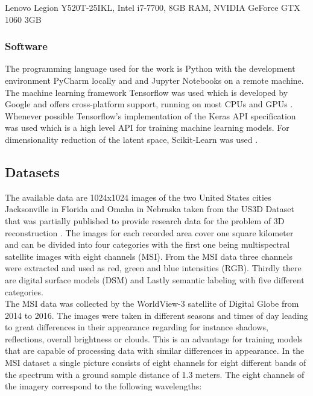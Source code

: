Lenovo Legion Y520T-25IKL, Intel i7-7700, 8GB RAM, NVIDIA GeForce GTX 1060 3GB

\subsubsection{Software}

The programming language used for the work is Python \parencite{1995-rossum-python} with the development
environment PyCharm locally
and and Jupyter Notebooks on a remote machine. The machine learning framework Tensorflow was used which
is developed by Google and offers cross-platform support, running on most CPUs and GPUs 
\parencite{2015-martin-tensorflow}.
Whenever possible Tensorflow's implementation of the Keras API specification was used which is a high level API
for training machine learning models. For dimensionality reduction of the latent space, Scikit-Learn was used
\parencite{2011-pedregosa-scikit}.

\subsection{Datasets} \label{datasets}  

The available data are 1024x1024 images of the two United States cities Jacksonville
in Florida and Omaha in Nebraska taken from the US3D Dataset that
was partially published to provide research data for the problem
of 3D reconstruction \parencite{2019-bosch-semantic}.
The images for each recorded area cover one square kilometer and can be divided 
into four categories with the first one being multispectral satellite images with eight channels (MSI). 
From the MSI data three channels were extracted and used as red, green and blue intensities (RGB). 
Thirdly there are digital surface models (DSM) and Lastly semantic labeling with five different categories. \\

The MSI data was collected by the WorldView-3 satellite of Digital Globe from 2014 to 2016.
The images were taken in different seasons and times of day leading to great differences
in their appearance regarding for instance shadows, reflections, overall brightness or clouds.
This is an advantage for training models that are capable of processing data with similar differences in 
appearance.
In the MSI dataset a single picture consists of eight channels for eight different bands of the spectrum with
a ground sample distance of 1.3 meters. The eight channels of the imagery correspond to the following wavelengths:

